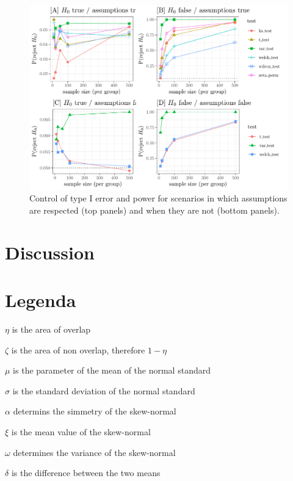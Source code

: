 \documentclass[10pt]{article}\usepackage[]{graphicx}\usepackage[]{xcolor}
\makeatletter
\def\maxwidth{ %
  \ifdim\Gin@nat@width>\linewidth
    \linewidth
  \else
    \Gin@nat@width
  \fi
}
\newenvironment{knitrout}{}{} %
\makeatother
\begin{document}
\begin{knitrout}
\color{fgcolor}\begin{figure}

{\centering \includegraphics[width=\maxwidth]{figure/assunzioni-1} 

}

\caption[Control of type I error and power for scenarios in which assumptions are respected (top panels) and when they are not (bottom panels)]{Control of type I error and power for scenarios in which assumptions are respected (top panels) and when they are not (bottom panels).}\label{fig:assunzioni}
\end{figure}

\end{knitrout}




\section{Discussion}

\newpage

\section{Legenda}

$\eta$ is the area of overlap

$\zeta$ is the area of non overlap, therefore $1 - \eta$

$\mu$ is the parameter of the mean of the normal standard 

$\sigma$ is the standard deviation of the normal standard

$\alpha$ determins the simmetry of the skew-normal

$\xi$ is the mean value of the skew-normal

$\omega$ determines the variance of the skew-normal

$\delta$ is the difference between the two means



\newpage


\end{document}
